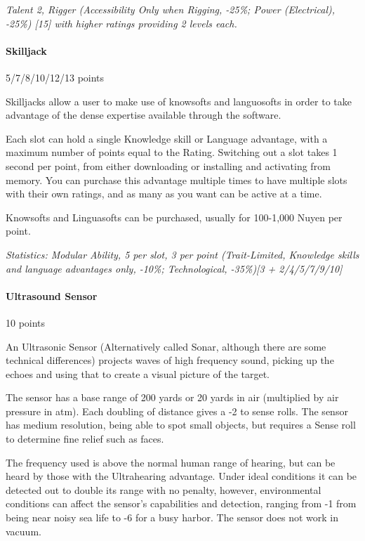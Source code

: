 \begin{multicols*}{3}
	\textit{\textcolor{OliveGreen}{Talent 2, Rigger (Accessibility  Only when Rigging, -25\%; Power (Electrical), -25\%) [15] with higher ratings providing 2 levels each.}}
	
	\paragraph{Skilljack}
	\begin{flushright}
		5/7/8/10/12/13 points
	\end{flushright}
	
	Skilljacks allow a user to make use of knowsofts and languosofts in order to take advantage of the dense expertise available through the software. 
	
	Each slot can hold a single Knowledge skill or Language advantage, with a maximum number of points equal to the Rating. Switching out a slot takes 1 second per point, from either downloading or installing and activating from memory. You can purchase this advantage multiple times to have multiple slots with their own ratings, and as many as you want can be active at a time.
	
	Knowsofts and Linguasofts can be purchased, usually for 100-1,000 Nuyen per point.
	
	\textit{\textcolor{OliveGreen}{Statistics: Modular Ability, 5 per slot, 3 per point (Trait-Limited, Knowledge skills and language advantages only, -10\%; Technological, -35\%)[3 + 2/4/5/7/9/10]}}
	
	\paragraph{Ultrasound Sensor}
	\begin{flushright}
		10 points
	\end{flushright}
	
	An Ultrasonic Sensor (Alternatively called Sonar, although there are some technical differences) projects waves of high frequency sound, picking up the echoes and using that to create a visual picture of the target.
	
	The sensor has a base range of 200 yards or 20 yards in air (multiplied by air pressure in atm). Each doubling of distance gives a -2 to sense rolls. The sensor has medium resolution, being able to spot small objects, but requires a Sense roll to determine fine relief such as faces.
	
	The frequency used is above the normal human range of hearing, but can be heard by those with the Ultrahearing advantage. Under ideal conditions it can be detected out to double its range with no penalty, however, environmental conditions can affect the sensor's capabilities and detection, ranging from -1 from being near noisy sea life to -6 for a busy harbor. The sensor does not work in vacuum.
	

\end{multicols*}
